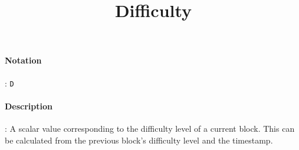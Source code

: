 \documentclass[10pt,a4paper,oneside]{scrartcl}
\author{}
\title{Difficulty}
\date{}
\begin{document}
\maketitle
\paragraph{Notation}: \texttt{D}
\paragraph{Description}: A scalar value corresponding to the difficulty level of a current block. This can be calculated from the previous block's difficulty level and the timestamp. 
\end{document}
